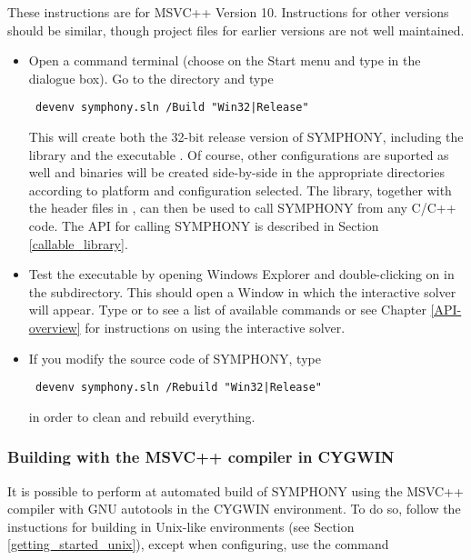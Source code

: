 These instructions are for MSVC++ Version 10. Instructions for other versions
should be similar, though project files for earlier versions are not well
maintained. 

\begin{itemize}
\item Open a command terminal (choose  on the Start menu and type
 in the dialogue box). Go to the 
directory and type 
{\color{Brown}
\begin{verbatim}
 devenv symphony.sln /Build "Win32|Release"
\end{verbatim}
}This will create both the 32-bit release version of SYMPHONY, including the
library  and the executable . Of course,
other configurations are suported as well and binaries will be created
side-by-side in the appropriate directories according to platform and
configuration selected. The library, together with the header files in
, can then be used to call SYMPHONY from any
C/C++ code. The API for calling SYMPHONY is described in Section
\ref{callable_library}.

\item Test the executable by opening Windows Explorer and double-clicking
on  in the
 subdirectory. This should open a Window in
which the interactive solver will appear. Type  or  to see
a list of available commands or see Chapter
\ref{API-overview} for instructions on using the interactive solver.

\item If you modify the source code of SYMPHONY, type 
{\color{Brown}
\begin{verbatim}
 devenv symphony.sln /Rebuild "Win32|Release"
\end{verbatim}
}
in order to clean and rebuild everything.
\end{itemize} 

\subsubsection{Building with the MSVC++ compiler in CYGWIN}

It is possible to perform at automated build of SYMPHONY using the MSVC++
compiler  with GNU autotools in the CYGWIN environment. To do so,
follow the instuctions for building in Unix-like environments (see Section
\ref{getting_started_unix}), except when configuring, use the command

